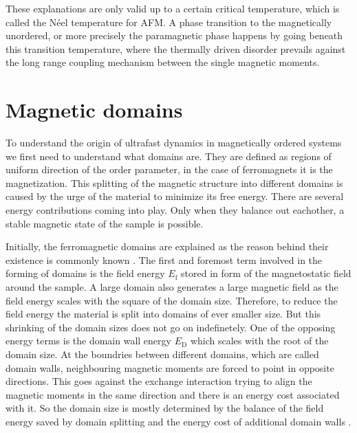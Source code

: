 \FloatBarrier
These explanations are only valid up to a certain critical temperature, which is called the Néel temperature for AFM.
A phase transition to the magnetically unordered, or more precisely the paramagnetic phase happens by going beneath this transition temperature, where the thermally driven disorder prevails against the long range coupling mechanism between the single magnetic moments.


\section{Magnetic domains}
To understand the origin of ultrafast dynamics in magnetically ordered systems we first need to understand what domains are.
They are defined as regions of uniform direction of the order parameter, in the case of ferromagnets it is the magnetization.
This splitting of the magnetic structure into different domains is caused by the urge of the material to minimize its free energy.
There are several energy contributions coming into play.
Only when they balance out eachother, a stable magnetic state of the sample is possible.

Initially, the ferromagnetic domains are explained as the reason behind their existence is commonly known \cite{tanner_antiferromagnetic_1979}.
The first and foremost term involved in the forming of domains is the field energy $E_{\text{f}}$ stored in form of the magnetostatic field around the sample.
A large domain also generates a large magnetic field as the field energy scales with the square of the domain size.
Therefore, to reduce the field energy the material is split into domains of ever smaller size.
But this shrinking of the domain sizes does not go on indefinetely.
One of the opposing energy terms is the domain wall energy $E_{\text{D}}$ which scales with the root of the domain size.
At the boundries between different domains, which are called domain walls, neighbouring magnetic moments are forced to point in opposite directions.
This goes against the exchange interaction trying to align the magnetic moments in the same direction and there is an energy cost associated with it.
So the domain size is mostly determined by the balance of the field energy saved by domain splitting and the energy cost of additional domain walls \cite{cullity_introduction_2009}.


